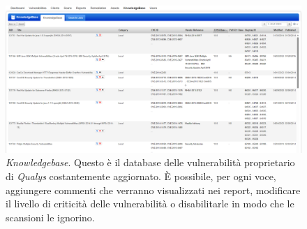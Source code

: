 \documentclass[target=mst,aauheader=]{thud}
\begin{document}
\begin{figure}
\centering
\includegraphics[scale=0.35]{images/qualys_kb.png}
    \caption{\textit{Knowledgebase}. Questo è il database delle vulnerabilità proprietario di \textit{Qualys} costantemente aggiornato. È possibile, per ogni voce, aggiungere commenti che verranno visualizzati nei report, modificare il livello di criticità delle vulnerabilità o disabilitarle in modo che le scansioni le ignorino.}
\end{figure}

\backmatter




\end{document}
